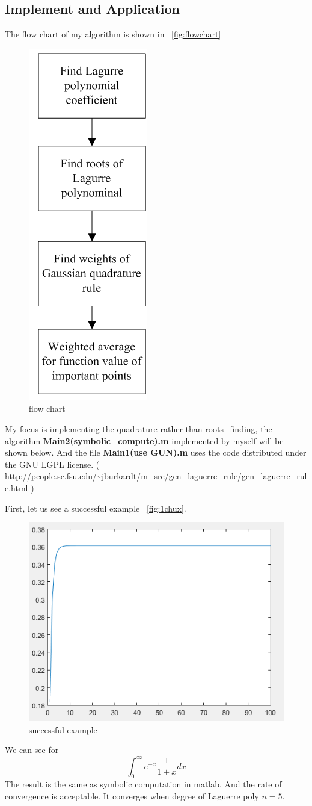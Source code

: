 \documentclass[
10pt, %
a4paper, %
oneside, %
headinclude,footinclude, %
BCOR5mm, %
]{scrartcl}
\theoremstyle{definition}
\begin{document}
\subsection{Implement and Application}
The flow chart of my algorithm is shown in ~\vref{fig:flowchart}
\begin{figure}[tb]
\centering
\includegraphics[width=.2\columnwidth]{./fig/flow_chart.png}
\caption[flow chart]{flow chart}
\label{fig:flowchart}

\end{figure}
My focus is implementing the quadrature rather than roots\_finding, the algorithm {\bf{Main2(symbolic\_compute).m}} implemented by myself will be shown below. And the file {\bf{Main1(use GUN).m}} uses the code distributed under the GNU LGPL license. (
\url{http://people.sc.fsu.edu/~jburkardt/m_src/gen_laguerre_rule/gen_laguerre_rule.html })

First, let us see a successful example ~\vref{fig:1chux}.
\begin{figure}[tb]
\centering
\includegraphics[width=.5\columnwidth]{./fig/1chux.png}
\caption[successful example]{successful example}
\label{fig:1chux}

\end{figure}
 We can see for \[
\int_{0}^{\infty}e^{-x}\frac{1}{1+x}dx
\]The result is the same as symbolic computation in matlab. And the rate of convergence is acceptable. It converges when degree of  Laguerre poly $n=5$.
\end{document}
